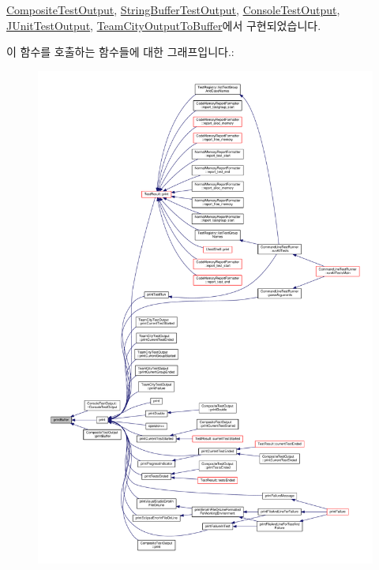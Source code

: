 \hyperlink{class_composite_test_output_a6840b2f395620a01207db9b9c9c5d1a8}{Composite\+Test\+Output}, \hyperlink{class_string_buffer_test_output_a8b83bd531b9e38a5dd9c61e14bf1636c}{String\+Buffer\+Test\+Output}, \hyperlink{class_console_test_output_a8b83bd531b9e38a5dd9c61e14bf1636c}{Console\+Test\+Output}, \hyperlink{class_j_unit_test_output_abf2e01aef95538a13475f442d3630b9d}{J\+Unit\+Test\+Output}, \hyperlink{class_team_city_output_to_buffer_a8b83bd531b9e38a5dd9c61e14bf1636c}{Team\+City\+Output\+To\+Buffer}에서 구현되었습니다.



이 함수를 호출하는 함수들에 대한 그래프입니다.\+:
\nopagebreak
\begin{figure}[H]
\begin{center}
\leavevmode
\includegraphics[width=350pt]{class_test_output_a83ee46e0da3bb079280fc397b48026d8_icgraph}
\end{center}
\end{figure}


